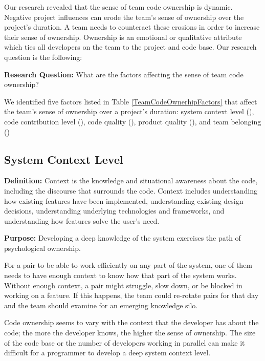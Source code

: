 Our research revealed that the sense of team code ownership is dynamic. Negative project influences can erode the team's sense of ownership over the project's duration. A team needs to counteract these erosions in order to increase their sense of ownership. Ownership is an emotional or qualitative attribute which ties all developers on the team to the project and code base. Our research question is the following:

\textbf{Research Question:} What are the factors affecting the sense of team code ownership?

We identified five factors listed in Table \ref{TeamCodeOwnerhipFactors} that affect the team's sense of ownership over a project's duration: system context level (), code contribution level (), code quality (), product quality (), and team belonging ()

\subsection{System Context Level}
\textbf{Definition:} Context is the knowledge and situational awareness about the code, including the discourse that surrounds the code. Context includes  understanding how existing features have been implemented, understanding existing design decisions, understanding underlying technologies and frameworks, and understanding how features solve the user's need.

\textbf{Purpose:} Developing a deep knowledge of the system exercises the  path of psychological ownership.

For a pair to be able to work efficiently on any part of the system, one of them needs to have enough context to know how that part of the system works. Without enough context, a pair might struggle, slow down, or be blocked in working on a feature. If this happens, the team could re-rotate pairs for that day and the team should examine for an emerging knowledge silo. 

Code ownership seems to vary with the context that the developer has about the code; the more the developer knows, the higher the sense of ownership. The size of the code base or the number of developers working in parallel can make it difficult for a programmer to develop a deep system context level.

